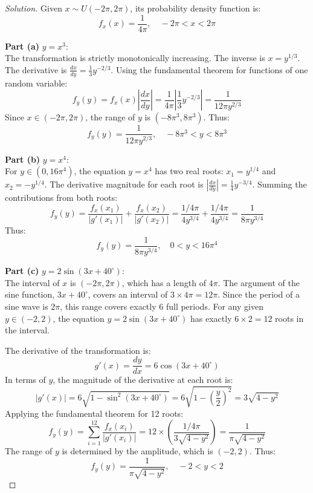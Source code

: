 \documentclass{article}
\begin{document}
\begin{proof}[Solution]
	Given $x \sim U(-2\pi, 2\pi)$, its probability density function is:
	\[
		f_x(x) = \frac{1}{4\pi}, \quad -2\pi < x < 2\pi
	\]
	
	\textbf{Part (a)} $y = x^3$: \\
	The transformation is strictly monotonically increasing. The inverse is $x = y^{1/3}$.
	The derivative is $\frac{dx}{dy} = \frac{1}{3}y^{-2/3}$.
	Using the fundamental theorem for functions of one random variable:
	\[
		f_y(y) = f_x(x) \left| \frac{dx}{dy} \right| = \frac{1}{4\pi} \left| \frac{1}{3} y^{-2/3} \right| = \frac{1}{12\pi y^{2/3}}
	\]
	Since $x \in (-2\pi, 2\pi)$, the range of $y$ is $(-8\pi^3, 8\pi^3)$. Thus:
	\[
		f_y(y) = \frac{1}{12\pi y^{2/3}}, \quad -8\pi^3 < y < 8\pi^3
	\]
	
	\textbf{Part (b)} $y = x^4$: \\
	For $y \in (0, 16\pi^4)$, the equation $y = x^4$ has two real roots: $x_1 = y^{1/4}$ and $x_2 = -y^{1/4}$.
	The derivative magnitude for each root is $\left| \frac{dx}{dy} \right| = \frac{1}{4} y^{-3/4}$.
	Summing the contributions from both roots:
	\[
		f_y(y) = \frac{f_x(x_1)}{|g'(x_1)|} + \frac{f_x(x_2)}{|g'(x_2)|} = \frac{1/4\pi}{4y^{3/4}} + \frac{1/4\pi}{4y^{3/4}} = \frac{1}{8\pi y^{3/4}}
	\]
	Thus:
	\[
		f_y(y) = \frac{1}{8\pi y^{3/4}}, \quad 0 < y < 16\pi^4
	\]

	\textbf{Part (c)} $y = 2 \sin(3x + 40^\circ)$: \\
The interval of $x$ is $(-2\pi, 2\pi)$, which has a length of $4\pi$. The argument of the sine function, $3x + 40^\circ$, covers an interval of $3 \times 4\pi = 12\pi$. Since the period of a sine wave is $2\pi$, this range covers exactly 6 full periods.
For any given $y \in (-2, 2)$, the equation $y = 2 \sin(3x + 40^\circ)$ has exactly $6 \times 2 = 12$ roots in the interval.

The derivative of the transformation is:
\[
    g'(x) = \frac{dy}{dx} = 6 \cos(3x + 40^\circ)
\]
In terms of $y$, the magnitude of the derivative at each root is:
\[
    |g'(x)| = 6 \sqrt{1 - \sin^2(3x + 40^\circ)} = 6 \sqrt{1 - \left(\frac{y}{2}\right)^2} = 3\sqrt{4 - y^2}
\]
Applying the fundamental theorem for 12 roots:
\[
    f_y(y) = \sum_{i=1}^{12} \frac{f_x(x_i)}{|g'(x_i)|} = 12 \times \left( \frac{1/4\pi}{3\sqrt{4 - y^2}} \right) = \frac{1}{\pi\sqrt{4 - y^2}}
\]
The range of $y$ is determined by the amplitude, which is $(-2, 2)$. Thus:
\[
    f_y(y) = \frac{1}{\pi\sqrt{4 - y^2}}, \quad -2 < y < 2
\]
\end{proof}
\end{document}
